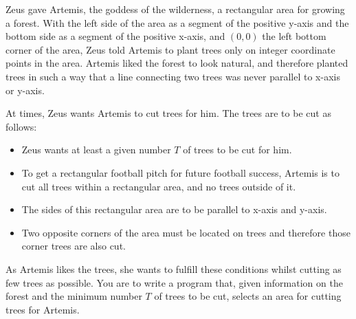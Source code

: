 Zeus gave Artemis, the goddess of the wilderness, a rectangular area for growing a forest. With the left side of the area as a segment of the positive y-axis and the bottom side as a segment of the positive x-axis, and $(0, 0)$ the left bottom corner of the area, Zeus told Artemis to plant trees only on integer coordinate points in the area. Artemis liked the forest to look natural, and therefore planted trees in such a way that a line connecting two trees was never parallel to x-axis or y-axis.

At times, Zeus wants Artemis to cut trees for him. The trees are to be cut as follows:
\begin{itemize}
\item Zeus wants at least a given number $T$ of trees to be cut for him.
\item To get a rectangular football pitch for future football success, Artemis is to cut all trees within a rectangular area, and no trees outside of it.
\item The sides of this rectangular area are to be parallel to x-axis and y-axis.
\item Two opposite corners of the area must be located on trees and therefore those corner trees are also cut.
\end{itemize}

As Artemis likes the trees, she wants to fulfill these conditions whilst cutting as few trees as possible. You are to write a program that, given information on the forest and the minimum number $T$ of trees to be cut, selects an area for cutting trees for Artemis. 